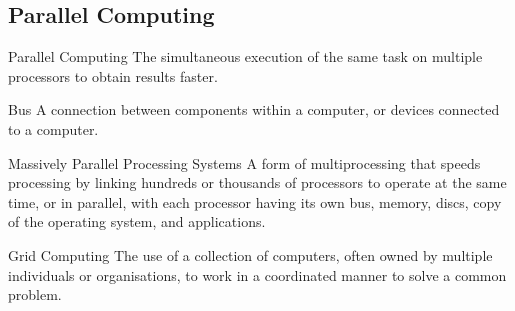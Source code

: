 \documentclass[\main/notes.tex]{subfiles}
\begin{document}
			\subsection{Parallel Computing}
				\begin{definition}{Parallel Computing}
					The simultaneous execution of the same task on multiple processors to obtain results faster.
				\end{definition}
				\begin{definition}{Bus}
					A connection between components within a computer, or devices connected to a computer.
				\end{definition}
				\begin{definition}{Massively Parallel Processing Systems}
					A form of multiprocessing that speeds processing by linking hundreds or thousands of processors to operate at the same time, or in parallel, with each processor having its own bus, memory, discs, copy of the operating system, and applications.
				\end{definition}
				\begin{definition}{Grid Computing}
					The use of a collection of computers, often owned by multiple individuals or organisations, to work in a coordinated manner to solve a common problem.
				\end{definition}
	\vbox{}
\end{document}
